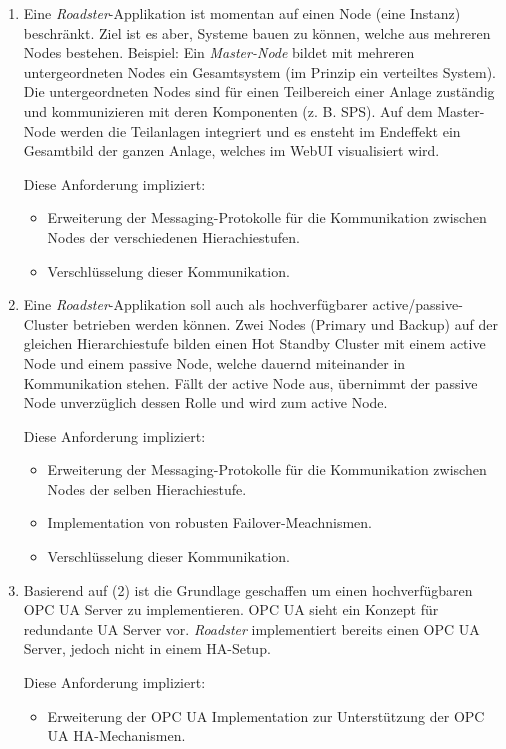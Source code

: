 \documentclass[a4paper]{article}
\begin{document}
\begin{enumerate}
	\item Eine \emph{Roadster}-Applikation ist momentan auf einen Node
		(eine Instanz) beschränkt. Ziel ist es aber, Systeme bauen zu
		können, welche aus mehreren Nodes bestehen. Beispiel: Ein
		\emph{Master-Node} bildet mit mehreren untergeordneten Nodes
		ein Gesamtsystem (im Prinzip ein verteiltes System). Die
		untergeordneten Nodes sind für einen Teilbereich einer Anlage
		zuständig und kommunizieren mit deren Komponenten (z. B. SPS).
		Auf dem Master-Node werden die Teilanlagen integriert und es
		ensteht im Endeffekt ein Gesamtbild der ganzen Anlage, welches
		im WebUI visualisiert wird.

Diese Anforderung impliziert:

\begin{itemize}
	\item Erweiterung der Messaging-Protokolle für die Kommunikation
		zwischen Nodes der verschiedenen Hierachiestufen.

	\item Verschlüsselung dieser Kommunikation.
\end{itemize}

\item Eine \emph{Roadster}-Applikation soll auch als hochverfügbarer
	active/passive-Cluster betrieben werden können. Zwei Nodes (Primary und
	Backup) auf der gleichen Hierarchiestufe bilden einen Hot Standby
	Cluster mit einem active Node und einem passive Node, welche dauernd
	miteinander in Kommunikation stehen. Fällt der active Node aus,
	übernimmt der passive Node unverzüglich dessen Rolle und wird zum
	active Node.

Diese Anforderung impliziert:

\begin{itemize}
	\item Erweiterung der Messaging-Protokolle für die Kommunikation
		zwischen Nodes der selben Hierachiestufe.

	\item Implementation von robusten Failover-Meachnismen.

	\item Verschlüsselung dieser Kommunikation.
\end{itemize}


\item Basierend auf (2) ist die Grundlage geschaffen um einen hochverfügbaren
	OPC UA Server zu implementieren. OPC UA \cite{opc-ua} sieht ein Konzept
	für redundante UA Server vor. \emph{Roadster} implementiert bereits
	einen OPC UA Server, jedoch nicht in einem HA-Setup.

Diese Anforderung impliziert:

\begin{itemize}
	\item Erweiterung der OPC UA Implementation zur Unterstützung der OPC
		UA HA-Mechanismen.
\end{itemize}
\end{enumerate}
\end{document}
